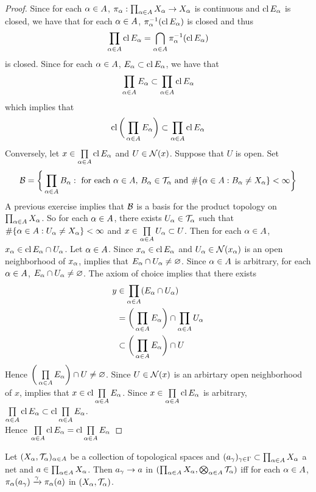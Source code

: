 \documentclass{book}
\begin{document}
	\begin{proof}
		Since for each $\alpha \in A$, $\pi_{\alpha}: \prod_{\alpha \in A}X_{\alpha} \rightarrow X_{\alpha}$ is continuous and $\operatorname{cl} E_{\alpha}$ is closed, we have that for each $\alpha \in A$, $ \pi_{\alpha}^{-1}(\operatorname{cl} E_{\alpha})$ is closed and thus 
		$$\prod_{\alpha \in A} \operatorname{cl} E_{\alpha} = \bigcap_{\alpha \in A} \pi_{\alpha}^{-1}(\operatorname{cl} E_{\alpha})$$
		is closed. Since for each $\alpha \in A$, $E_{\alpha} \subset \operatorname{cl} E_{\alpha}$, we have that 
		$$ \prod_{\alpha \in A}  E_{\alpha}  \subset \prod_{\alpha \in A} \operatorname{cl} E_{\alpha}$$ 
		which implies that 
		$$ \operatorname{cl} \bigg( \prod_{\alpha \in A}  E_{\alpha} \bigg)  \subset \prod_{\alpha \in A} \operatorname{cl} E_{\alpha}$$ 
		Conversely, let $x \in \prod\limits_{\alpha \in A} \operatorname{cl} E_{\alpha}$ and $U \in \mathcal{N}(x)$. Suppose that $U$ is open. Set 
		$$\mathcal{B} = \bigg \{\prod_{\alpha \in A}B_{\alpha}: \text{ for each $\alpha \in A$,  $B_{\alpha} \in \mathcal{T}_{\alpha}$ and $\# \{\alpha \in A: B_{\alpha} \neq X_{\alpha}\} < \infty$} \bigg\}$$
		A previous exercise implies that $\mathcal{B}$ is a basis for the product topology on $\prod_{\alpha \in A}X_{\alpha}$. So for each $\alpha \in A$, there exists $U_{\alpha} \in \mathcal{T}_{\alpha}$ such that $\# \{\alpha \in A: U_{\alpha} \neq X_{\alpha}\} < \infty$ and $x \in \prod\limits_{\alpha \in A} U_{\alpha} \subset U$. Then for each $\alpha \in A$, $x_{\alpha} \in \operatorname{cl} E_{\alpha} \cap U_{\alpha}$. Let $\alpha \in A$. Since $x_{\alpha} \in \operatorname{cl} E_{\alpha}$ and $U_{\alpha} \in \mathcal{N}(x_{\alpha})$ is an open neighborhood of $x_{\alpha}$,  implies that $E_{\alpha} \cap U_{\alpha} \neq \varnothing$. Since $\alpha \in A$ is arbitrary, for each $\alpha \in A$, $E_{\alpha} \cap U_{\alpha} \neq \varnothing$. The axiom of choice implies that there exists
		\begin{align*}
			y 
			& \in \prod\limits_{\alpha \in A}  (E_{\alpha} \cap U_{\alpha} ) \\
			& = \bigg( \prod\limits_{\alpha \in A} E_{\alpha} \bigg) \cap \prod_{\alpha \in A} U_{\alpha} \\
			& \subset \bigg( \prod\limits_{\alpha \in A} E_{\alpha} \bigg) \cap U
		\end{align*}
		Hence $\bigg( \prod\limits_{\alpha \in A} E_{\alpha} \bigg) \cap U \neq \varnothing$. Since $U \in \mathcal{N}(x)$ is an arbirtary open neighborhood of $x$,  implies that $x \in \operatorname{cl} \prod\limits_{\alpha \in A} E_{\alpha}$. Since $x \in \prod\limits_{\alpha \in A} \operatorname{cl} E_{\alpha}$ is arbitrary, $\prod\limits_{\alpha \in A} \operatorname{cl} E_{\alpha} \subset  \operatorname{cl} \prod\limits_{\alpha \in A} E_{\alpha}$. \\
		Hence $\prod\limits_{\alpha \in A} \operatorname{cl} E_{\alpha} = \operatorname{cl} \prod\limits_{\alpha \in A} E_{\alpha}$
	\end{proof}

	\begin{ex} 
		Let $(X_{\alpha}, \mathcal{T}_{\alpha})_{\alpha \in A}$ be a collection of topological spaces and $(a_{\gamma})_{\gamma \in \Gamma} \subset \prod_{\alpha \in A} X_{\alpha}$ a net and $a \in \prod_{\alpha \in A} X_{\alpha}$. Then $a_{\gamma} \rightarrow a$ in $(\prod_{\alpha \in A} X_{\alpha}, \bigotimes_{\alpha \in A} \mathcal{T}_{\alpha})$ iff for each $\alpha \in A$, $\pi_{\alpha}(a_{\gamma}) \xrightarrow{\gamma} \pi_{\alpha}(a)$ in $(X_{\alpha}, \mathcal{T}_{\alpha})$. 
	\end{ex}
\end{document}
